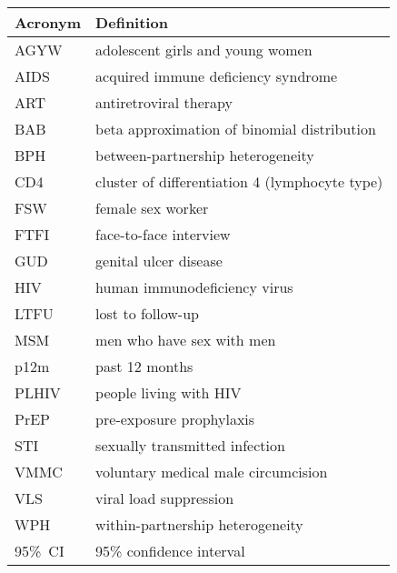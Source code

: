 \begin{tabular}{ll}
  \toprule
  Acronym & Definition \\
  \midrule
  AGYW    & adolescent girls and young women \\
  AIDS    & acquired immune deficiency syndrome \\
  ART     & antiretroviral therapy \\
  BAB     & beta approximation of binomial distribution \\
  BPH     & between-partnership heterogeneity \\
  CD4     & cluster of differentiation 4 (lymphocyte type) \\
  FSW     & female sex worker \\
  FTFI    & face-to-face interview \\
  GUD     & genital ulcer disease \\
  HIV     & human immunodeficiency virus \\
  LTFU    & lost to follow-up \\
  MSM     & men who have sex with men \\
  p12m    & past 12 months \\
  PLHIV   & people living with HIV \\
  PrEP    & pre-exposure prophylaxis \\
  STI     & sexually transmitted infection \\
  VMMC    & voluntary medical male circumcision \\
  VLS     & viral load suppression \\
  WPH     & within-partnership heterogeneity \\
  95\%~CI & 95\% confidence interval \\
  \bottomrule
\end{tabular}